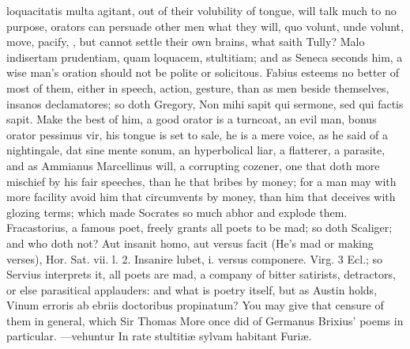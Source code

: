 {loquacitatis multa agitant, out of their volubility of tongue, will
talk much to no purpose, orators can persuade other men what they will,
quo volunt, unde volunt, move, pacify, \etc{}, but cannot settle their own
brains, what saith Tully? Malo indisertam prudentiam, quam loquacem,
stultitiam; and as Seneca seconds him, a wise man's oration should
not be polite or solicitous. Fabius esteems no better of most of
them, either in speech, action, gesture, than as men beside themselves,
insanos declamatores; so doth Gregory, Non mihi sapit qui sermone, sed
qui factis sapit. Make the best of him, a good orator is a turncoat, an
evil man, bonus orator pessimus vir, his tongue is set to sale, he is a
mere voice, as he said of a nightingale, dat sine mente sonum, an
hyperbolical liar, a flatterer, a parasite, and as  Ammianus
Marcellinus will, a corrupting cozener, one that doth more mischief by
his fair speeches, than he that bribes by money; for a man may with
more facility avoid him that circumvents by money, than him that
deceives with glozing terms; which made Socrates so much abhor and
explode them. Fracastorius, a famous poet, freely grants all poets
to be mad; so doth Scaliger; and who doth not? Aut insanit homo,
aut versus facit (He's mad or making verses), Hor. Sat. vii. l. 2.
Insanire lubet, i. versus componere. Virg. 3 Ecl.; so Servius
interprets it, all poets are mad, a company of bitter satirists,
detractors, or else parasitical applauders: and what is poetry itself,
but as Austin holds, Vinum erroris ab ebriis doctoribus propinatum? You
may give that censure of them in general, which Sir Thomas More once
did of Germanus Brixius' poems in particular.
---vehuntur
In rate stultiti\ae{} sylvam habitant Furi\ae{}.

}
